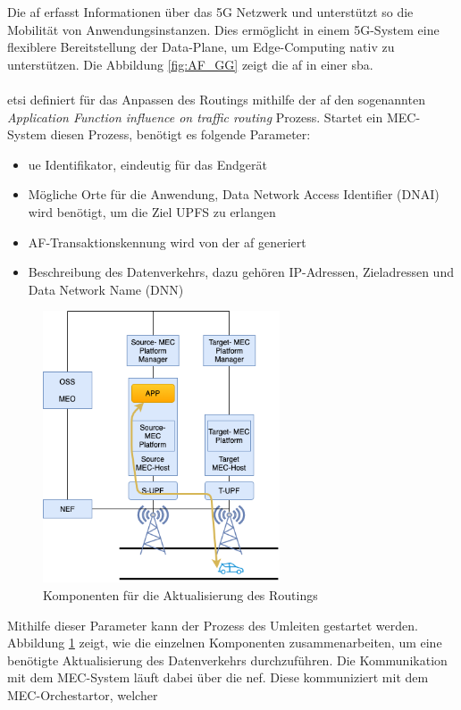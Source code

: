 \documentclass[runningheads]{llncs}
\numberwithin{figure}{section}
\begin{document}
Die \acrfull{af} erfasst Informationen über das 5G Netzwerk und unterstützt so die Mobilität von Anwendungsinstanzen. 
Dies ermöglicht in einem 5G-System eine flexiblere Bereitstellung der Data-Plane, um Edge-Computing nativ zu unterstützen.
Die Abbildung \ref{fig:AF_GG} zeigt die \acrshort{af} in einer \acrlong{sba}.
\\
\\
\acrshort{etsi} definiert für das Anpassen des Routings mithilfe der \acrshort{af} den sogenannten \textit{Application Function influence on traffic routing} Prozess.
Startet ein MEC-System diesen Prozess, benötigt es folgende Parameter:
\begin{itemize}
  \item \acrshort{ue} Identifikator, eindeutig für das Endgerät
  \item Mögliche Orte für die Anwendung, Data Network Access Identifier (DNAI) wird benötigt, um die Ziel UPFS zu erlangen
  \item AF-Transaktionskennung wird von der \acrshort{af} generiert
  \item Beschreibung des Datenverkehrs, dazu gehören IP-Adressen, Zieladressen und Data Network Name (DNN)
\end{itemize}
\begin{figure}
  \centering
  \includegraphics[width=7cm]{images/Datenverkehr_Update.png}
  \caption{Komponenten für die Aktualisierung des Routings}
  \label{fig:Datenverkehr_Update}
\end{figure}
Mithilfe dieser Parameter kann der Prozess des Umleiten gestartet werden.
Abbildung \ref{fig:Datenverkehr_Update} zeigt, wie die einzelnen Komponenten zusammenarbeiten, um eine benötigte Aktualisierung des Datenverkehrs durchzuführen.
Die Kommunikation mit dem MEC-System läuft dabei über die \acrshort{nef}. Diese kommuniziert mit dem MEC-Orchestartor, welcher
\end{document}
